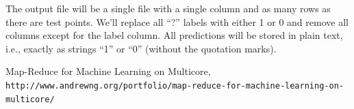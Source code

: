 \documentclass{neu_handout}
\begin{document}
The output file will be a single file with a single column and as many rows as there are test points. We'll replace all “?” labels with either 1 or 0 and remove all columns except for the label column. All predictions will be stored in plain text, i.e., exactly as strings “1” or “0” (without the quotation marks).


\begin{thebibliography}{9}
Map-Reduce for Machine Learning on Multicore,
\\\texttt{http://www.andrewng.org/portfolio/map-reduce-for-machine-learning-on-multicore/}
\end{thebibliography}
\end{document}
